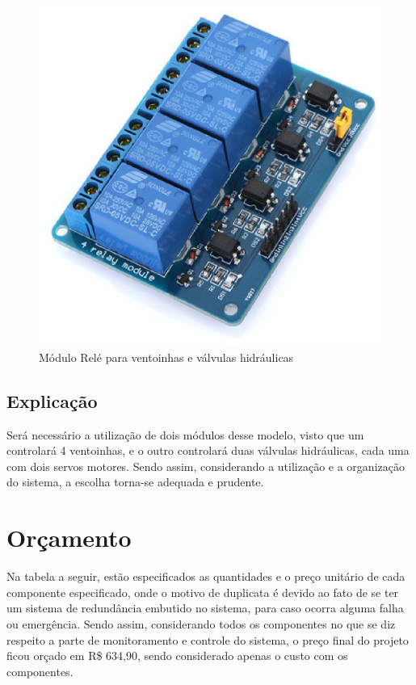 \begin{figure}[!htb]                   
	\centering                          
	\includegraphics[scale=0.4]{figuras/Figura_11.eps}
	\caption{Módulo Relé para ventoinhas e válvulas hidráulicas}               
\end{figure}
\subsection{Explicação}
Será necessário a utilização de dois módulos desse modelo, visto que um controlará 4 ventoinhas, e o outro controlará duas válvulas hidráulicas, cada uma com dois servos motores. Sendo assim, considerando a utilização e a organização do sistema, a escolha torna-se adequada e prudente.\\
\section{Orçamento}
Na tabela a seguir, estão especificados as quantidades e o preço unitário de cada componente especificado, onde o motivo de duplicata é devido ao fato de se ter um sistema de redundância embutido no sistema, para caso ocorra alguma falha ou emergência. Sendo assim, considerando todos os componentes no que se diz respeito a parte de monitoramento e controle do sistema, o preço final do projeto ficou orçado em R\$ 634,90, sendo considerado apenas o custo com os componentes.

